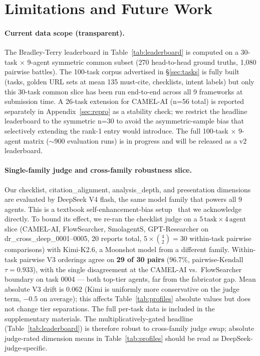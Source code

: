 \documentclass{article}
\begin{document}
\section{Limitations and Future Work}
\label{sec:limitations}

\paragraph{Current data scope (transparent).} The Bradley-Terry leaderboard in Table~\ref{tab:leaderboard} is computed on a 30-task $\times$ 9-agent symmetric common subset (270 head-to-head ground truths, 1{,}080 pairwise battles). The 100-task corpus advertised in \S\ref{sec:tasks} is fully built (tasks, golden URL sets at mean 135 must-cite, checklists, intent labels) but only this 30-task common slice has been run end-to-end across all 9 frameworks at submission time. A 26-task extension for CAMEL-AI (n=56 total) is reported separately in Appendix~\ref{sec:repro} as a stability check; we restrict the headline leaderboard to the symmetric n=30 to avoid the asymmetric-sample bias that selectively extending the rank-1 entry would introduce. The full 100-task $\times$ 9-agent matrix (${\sim}$900 evaluation runs) is in progress and will be released as a v2 leaderboard.

\paragraph{Single-family judge and cross-family robustness slice.} Our checklist, citation\_alignment, analysis\_depth, and presentation dimensions are evaluated by DeepSeek V4 flash, the same model family that powers all 9 agents. This is a textbook self-enhancement-bias setup~\citep{llmjudge2024} that we acknowledge directly. To bound its effect, we re-ran the checklist judge on a $5\,\text{task} \times 4\,\text{agent}$ slice (CAMEL-AI, FlowSearcher, SmolagentS, GPT-Researcher on dr\_cross\_deep\_0001--0005, 20 reports total, $5{\times}\binom{4}{2}=30$ within-task pairwise comparisons) with Kimi-K2.6, a Moonshot model from a different family. Within-task pairwise V3 orderings agree on \textbf{29 of 30 pairs} (96.7\%, pairwise-Kendall $\tau{=}0.933$), with the single disagreement at the CAMEL-AI vs.\ FlowSearcher boundary on task 0004 — both top-tier agents, far from the fabricator gap. Mean absolute V3 drift is $0.062$ (Kimi is uniformly more conservative on the judge term, $-0.5$ on average); this affects Table~\ref{tab:profiles} absolute values but does not change tier separations. The full per-task data is included in the supplementary materials. The multiplicatively-gated headline (Table~\ref{tab:leaderboard}) is therefore robust to cross-family judge swap; absolute judge-rated dimension means in Table~\ref{tab:profiles} should be read as DeepSeek-judge-specific.
\end{document}
